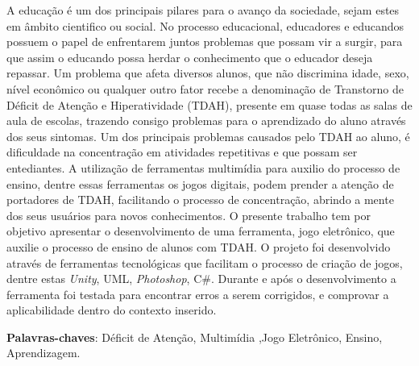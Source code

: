 \documentclass[
	12pt,				%
    oneside,			%
	a4paper,			%
	english,			%
	french,				%
	spanish,			%
	brazil,				%
	]{abntex2}
\begin{document}

\begin{resumo} %
	A educação é um dos principais pilares para o avanço da sociedade, sejam estes em âmbito cientifico ou social. No processo educacional, educadores e educandos possuem o papel de enfrentarem juntos problemas que possam vir a surgir, para que assim o educando possa herdar o conhecimento que o educador deseja repassar. Um problema que afeta diversos alunos, que não discrimina idade, sexo, nível econômico ou qualquer outro fator recebe a denominação de Transtorno de Déficit de Atenção e Hiperatividade (TDAH), presente em quase todas as salas de aula de escolas, trazendo consigo problemas para o aprendizado do aluno através dos seus sintomas. Um dos principais problemas causados pelo TDAH ao aluno, é dificuldade na concentração em atividades repetitivas e que possam ser entediantes. A utilização de ferramentas multimídia para auxilio do processo de ensino, dentre essas ferramentas os jogos digitais, podem prender a atenção de portadores de TDAH, facilitando o processo de concentração, abrindo a mente dos seus usuários para novos conhecimentos. O presente trabalho tem por objetivo apresentar o desenvolvimento de uma ferramenta, jogo eletrônico, que auxilie o processo de ensino de alunos com TDAH. O projeto foi desenvolvido através de ferramentas tecnológicas que facilitam o processo de criação de jogos, dentre estas \textit{Unity}, UML, \textit{Photoshop}, C\#. Durante e após o desenvolvimento a ferramenta foi testada para encontrar erros a serem corrigidos, e comprovar a aplicabilidade dentro do contexto inserido.
 \vspace{\onelineskip}
    
 \noindent
 \textbf{Palavras-chaves}: Déficit de Atenção, Multimídia ,Jogo Eletrônico, Ensino, Aprendizagem.
\end{resumo} %
\end{document}
